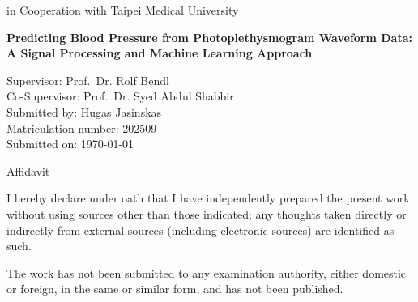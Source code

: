 \documentclass[12pt, bibliography=totoc]{scrartcl}
\begin{document}
\begin{titlepage}
\begin{center}
            \vspace{0.5cm}
            \Large
            in Cooperation with Taipei Medical University

            \hrulefill

            \vspace{1cm}

            \Huge
            \textbf{Predicting Blood Pressure from Photoplethysmogram Waveform Data: A Signal Processing and
            Machine Learning Approach}

        \end{center}

        \vfill
        \Large
        \noindent
        Supervisor: \tab\hspace{-2cm} Prof.\ Dr. Rolf Bendl\\
        Co-Supervisor: \tab\hspace{-2cm} Prof.\ Dr. Syed Abdul Shabbir\\
        Submitted by: \tab\hspace{-2cm} Hugas Jasinskas\\
        Matriculation number: \tab\hspace{-2cm} 202509\\
        Submitted on: \tab\hspace{-2cm} \today{}\\

    \end{titlepage}

    \newpage

    \begin{Huge}
        \centerline{Affidavit}
    \end{Huge}

    \vspace{2cm}

    \begin{Large}

        I hereby declare under oath that I have independently prepared the present work without using sources other than those indicated; any thoughts taken directly or indirectly from external sources (including electronic sources) are identified as such.

        The work has not been submitted to any examination authority, either domestic or foreign, in the same or similar form, and has not been published.

    \end{Large}

    \vfill
\end{document}
